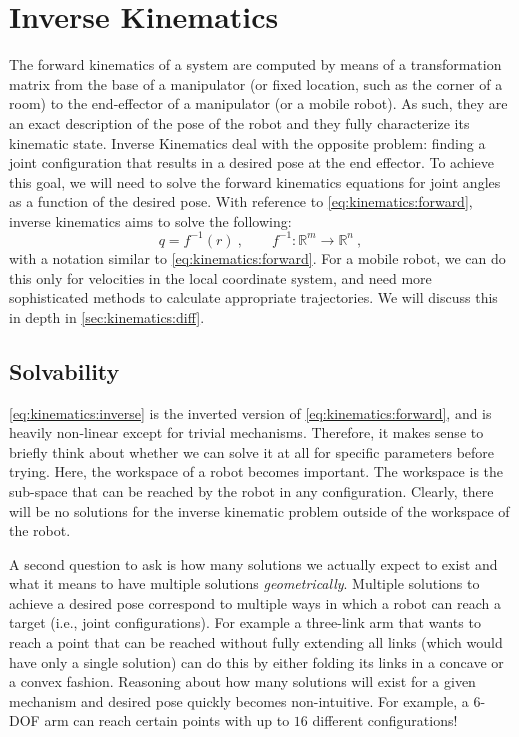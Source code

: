 \section{Inverse Kinematics}\label{sec:kinematics:ik}

The forward kinematics of a system are computed by means of a transformation matrix from the base of a manipulator (or fixed location, such as the corner of a room) to the end-effector of a manipulator (or a mobile robot).
As such, they are an exact description of the pose of the robot and they fully characterize its kinematic state.
Inverse Kinematics deal with the opposite problem: finding a joint configuration that results in a desired pose at the end effector.
To achieve this goal, we will need to solve the forward kinematics equations for joint angles as a function of the desired pose.
With reference to \cref{eq:kinematics:forward}, inverse kinematics aims to solve the following:
\begin{equation}\label{eq:kinematics:inverse}
q = f^{-1} (r)\ , \qquad f^{-1} : \mathbb{R}^m \rightarrow \mathbb{R}^n \ ,
\end{equation}
with a notation similar to \cref{eq:kinematics:forward}.
For a mobile robot, we can do this only for velocities in the local coordinate system, and need more sophisticated methods to calculate appropriate trajectories. We will discuss this in depth in \cref{sec:kinematics:diff}.

\subsection{Solvability}

\cref{eq:kinematics:inverse} is the inverted version of \cref{eq:kinematics:forward}, and is heavily non-linear except for trivial mechanisms.
Therefore, it makes sense to briefly think about whether we can solve it at all for specific parameters before trying.
Here, the workspace of a robot becomes important. The workspace is the sub-space that can be reached by the robot in any configuration.
Clearly, there will be no solutions for the inverse kinematic problem outside of the workspace of the robot.

A second question to ask is how many solutions we actually expect to exist and what it means to have multiple solutions \textsl{geometrically}.
Multiple solutions to achieve a desired pose correspond to multiple ways in which a robot can reach a target (i.e., joint configurations).
For example a three-link arm that wants to reach a point that can be reached without fully extending all links (which would have only a single solution) can do this by either folding its links in a concave or a convex fashion.
Reasoning about how many solutions will exist for a given mechanism and desired pose quickly becomes non-intuitive.
For example, a 6-DOF arm can reach certain points with up to $16$ different configurations!

